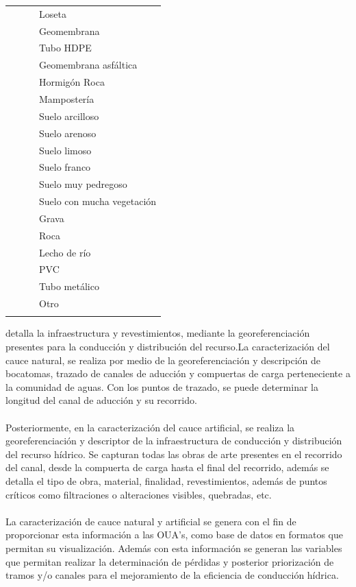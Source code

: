 \documentclass[]{article}
\begin{document}
\begin{longtable}{|p{3cm}|p{3.5cm}|p{3.5cm}|p{3.5cm}|}
    & & & Loseta\\
    \cline{4-4}
    & & & Geomembrana\\
    \cline{4-4}
    & & & Tubo HDPE\\
    \cline{4-4}
    & & & Geomembrana asfáltica\\
    \cline{4-4}
    & & & Hormigón Roca\\
    \cline{4-4}
    & & & Mampostería\\
    \cline{4-4}
    & & & Suelo arcilloso\\
    \cline{4-4}
    & & & Suelo arenoso\\
    \cline{4-4}
    & & & Suelo limoso\\
    \cline{4-4}
    & & & Suelo franco\\
    \cline{4-4}
    & & & Suelo muy pedregoso\\
    \cline{4-4}
    & & & Suelo con mucha vegetación\\
    \cline{4-4}
    & & & Grava\\
    \cline{4-4}
    & & & Roca\\
    \cline{4-4}
    & & & Lecho de río\\
    \cline{4-4}
    & & & PVC\\
    \cline{4-4}
    & & & Tubo metálico\\
    \cline{4-4}
    & & & Otro\\
    \cline{3-4}\\    
    
 
    
    
    \hline
\end{longtable}




detalla la infraestructura y revestimientos, mediante la georeferenciación  presentes para la conducción y distribución del recurso.La caracterización del cauce natural, se realiza por medio de la georeferenciación y descripción de bocatomas, trazado de canales de aducción y compuertas de carga perteneciente a la comunidad de aguas. Con los puntos de trazado, se puede determinar la longitud del canal de aducción y su recorrido.\\
\\
Posteriormente, en la caracterización del cauce artificial, se realiza la georeferenciación y descriptor de la infraestructura de conducción y distribución del recurso hídrico. Se capturan todas las obras de arte presentes en el recorrido del canal, desde la compuerta de carga hasta el final del recorrido, además se detalla el tipo de obra, material, finalidad, revestimientos, además de puntos críticos como filtraciones o alteraciones visibles, quebradas, etc.\\
\\
La caracterización de cauce natural y artificial se genera con el fin de proporcionar esta información a las OUA’s, como base de datos en formatos que permitan su visualización. Además con esta información se generan las variables que permitan realizar la determinación de pérdidas y posterior priorización de tramos y/o canales para el mejoramiento de la eficiencia de conducción hídrica.\\
\end{document}

